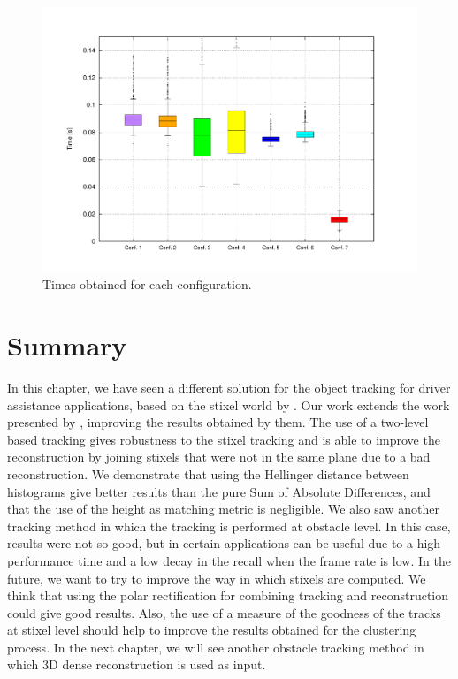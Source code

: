 \begin{figure}[h!]
\centering
\includegraphics[trim=50 40 80 60,clip]{times_average}
\caption{Times obtained for each configuration.}\label{fig:cp04_times_average}
\end{figure}

\section{Summary}\label{ch:chapter04_07}

In this chapter, we have seen a different solution for the object tracking for driver assistance applications, based on the stixel world by \cite{badino2009stixel}. Our work extends the work presented by \cite{gunyel2012stixels}, improving the results obtained by them. The use of a two-level based tracking gives robustness to the stixel tracking and is able to improve the reconstruction by joining stixels that were not in the same plane due to a bad reconstruction. We demonstrate that using the Hellinger distance between histograms give better results than the pure Sum of Absolute Differences, and that the use of the height as matching metric is negligible.
We also saw another tracking method in which the tracking is performed at obstacle level. In this case, results were not so good, but in certain applications can be useful due to a high performance time and a low decay in the recall when the frame rate is low.
In the future, we want to try to improve the way in which stixels are computed. We think that using the polar rectification for combining tracking and reconstruction could give good results. Also, the use of a measure of the goodness of the tracks at stixel level should help to improve the results obtained for the clustering process.
In the next chapter, we will see another obstacle tracking method in which 3D dense reconstruction is used as input.

